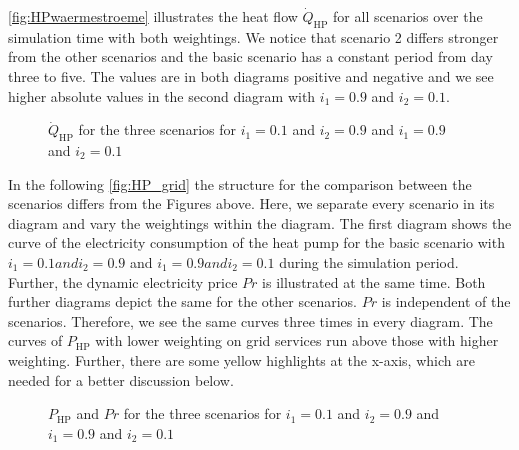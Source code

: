 \autoref{fig:HPwaermestroeme} illustrates the heat flow $\dot{Q}_\text{HP}$ for all scenarios over the simulation time with both weightings. We notice that scenario 2 differs stronger from the other scenarios and the basic scenario has a constant period from day three to five. The values are in both diagrams positive and negative and we see higher absolute values in the second diagram with $i_\text{1} = 0.9$ and $i_\text{2} = 0.1$.

    \begin{figure}[H]
           \centering
        \def\svgwidth{1.01\textwidth}
        
        \caption{$\dot{Q}_\text{HP}$ for the three scenarios for $i_\text{1} = 0.1$ and $i_\text{2} = 0.9$ and $i_\text{1} = 0.9$ and $i_\text{2} = 0.1$}
         \label{fig:HPwaermestroeme}
    \end{figure}
    
In the following \autoref{fig:HP_grid} the structure for the comparison between the scenarios differs from the Figures above. Here, we separate every scenario in its diagram and vary the weightings within the diagram. The first diagram shows the curve of the electricity consumption of the heat pump for the basic scenario with $i_\text{1} = 0.1 and i_\text{2} = 0.9$ and $i_\text{1} = 0.9 and i_\text{2} = 0.1$ during the simulation period. Further, the dynamic electricity price $Pr$ is illustrated at the same time. Both further diagrams depict the same for the other scenarios. $Pr$ is independent of the scenarios. Therefore, we see the same curves three times in every diagram. The curves of $P_\text{HP}$ with lower weighting on grid services run above those with higher weighting. Further, there are some yellow highlights at the x-axis, which are needed for a better discussion below. 
    \begin{figure}[H]
           \centering
        \def\svgwidth{1.05\textwidth}
        
        \caption{$P_\text{HP}$ and $Pr$ for the three scenarios for $i_\text{1} = 0.1$ and $i_\text{2} = 0.9$ and $i_\text{1} = 0.9$ and $i_\text{2} = 0.1$}
         \label{fig:HP_grid}
    \end{figure}
    
